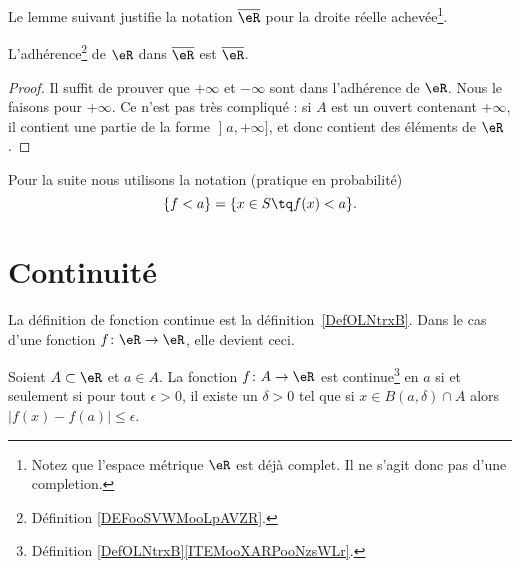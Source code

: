 Le lemme suivant justifie la notation \( \overline{ \eR }\) pour la droite réelle achevée\footnote{Notez que l'espace métrique \( \eR\) est déjà complet. Il ne s'agit donc pas d'une completion.}.
\begin{lemma}       \label{LEMooPZXHooEEXsTC}
	L'adhérence\footnote{Définition \ref{DEFooSVWMooLpAVZR}.} de \( \eR\) dans \( \overline{ \eR }\) est \( \overline{ \eR }\).
\end{lemma}

\begin{proof}
	Il suffit de prouver que \( +\infty\) et \( -\infty\) sont dans l'adhérence de \( \eR\). Nous le faisons pour \( +\infty\). Ce n'est pas très compliqué : si \( A\) est un ouvert contenant \( +\infty\), il contient une partie de la forme \( \mathopen] a , +\infty \mathclose]\), et donc contient des éléments de \( \eR\).
\end{proof}

Pour la suite nous utilisons la notation (pratique en probabilité)
\begin{equation}
	\{ f<a \}=\{ x\in S\tq f(x)<a \}.
\end{equation}


\section{Continuité}

La définition de fonction continue est la définition~\ref{DefOLNtrxB}. Dans le cas d'une fonction \( f\colon \eR\to \eR\), elle devient ceci.
\begin{proposition}      \label{PROPooVNGEooPwbxXP}
    Soient \( A\subset \eR\) et \( a\in A\). La fonction \( f\colon A\to \eR\) est continue\footnote{Définition \ref{DefOLNtrxB}\ref{ITEMooXARPooNzsWLr}.} en \( a\) si et seulement si pour tout \( \epsilon>0\), il existe un \( \delta>0\) tel que si \( x\in B(a,\delta)\cap A\) alors \( | f(x)-f(a) |\leq \epsilon\).
\end{proposition}

